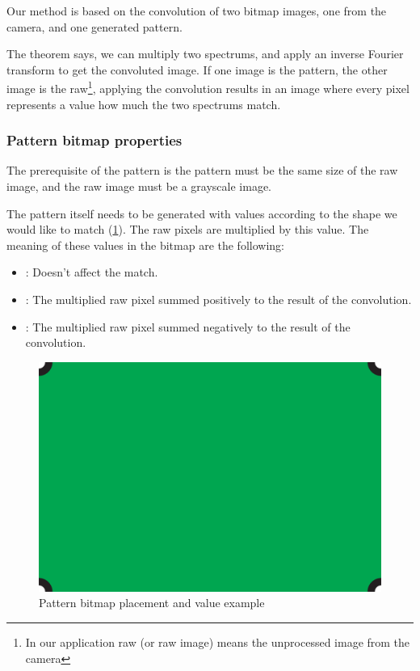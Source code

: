 Our method is based on the convolution of two bitmap images, one from the camera, and one generated pattern.

The theorem says, we can multiply two spectrums, and apply an inverse Fourier transform to get the convoluted image. If one image is the pattern, the other image is the raw\footnote{In our application raw (or raw image) means the unprocessed image from the camera}, applying the convolution results in an image where every pixel represents a value how much the two spectrums match.

\subsubsection{Pattern bitmap properties}

The prerequisite of the pattern is the pattern must be the same size of the raw image, and the raw image must be a grayscale image.

The pattern itself needs to be generated with values according to the shape we would like to match (\cref{fig:case_study:convoluter_image}). The raw pixels are multiplied by this value. The meaning of these values in the bitmap are the following: 
\begin{itemize}
	\item {}: Doesn't affect the match.
	\item {}: The multiplied raw pixel summed positively to the result of the convolution.
	\item {}: The multiplied raw pixel summed negatively to the result of the convolution.
\end{itemize}

\begin{figure}[h]
	\centering
	\includegraphics[valign=c,width=.65\linewidth]{include/figures/chapter_6/math_2}
	\caption{Pattern bitmap placement and value example}
	\label{fig:case_study:convoluter_image}
\end{figure}

